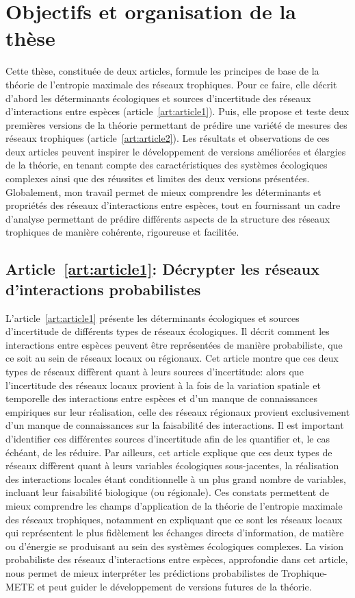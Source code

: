 \section{Objectifs et organisation de la thèse} 

Cette thèse, constituée de deux articles, formule les principes de base de la
théorie de l'entropie maximale des réseaux trophiques. Pour ce faire, elle
décrit d'abord les déterminants écologiques et sources d'incertitude des réseaux
d'interactions entre espèces (article~\ref{art:article1}). Puis, elle propose et
teste deux premières versions de la théorie permettant de prédire une variété de
mesures des réseaux trophiques (article~\ref{art:article2}). Les résultats et
observations de ces deux articles peuvent inspirer le développement de versions
améliorées et élargies de la théorie, en tenant compte des caractéristiques des
systèmes écologiques complexes ainsi que des réussites et limites des deux
versions présentées. Globalement, mon travail permet de mieux comprendre les
déterminants et propriétés des réseaux d'interactions entre espèces, tout en
fournissant un cadre d'analyse permettant de prédire différents aspects de la
structure des réseaux trophiques de manière cohérente, rigoureuse et facilitée.

\subsection{Article~\ref{art:article1}: Décrypter les réseaux d'interactions probabilistes} 

L'article~\ref{art:article1} présente les déterminants écologiques et sources
d'incertitude de différents types de réseaux écologiques. Il décrit comment les
interactions entre espèces peuvent être représentées de manière probabiliste,
que ce soit au sein de réseaux locaux ou régionaux. Cet article montre que ces
deux types de réseaux diffèrent quant à leurs sources d'incertitude: alors que
l'incertitude des réseaux locaux provient à la fois de la variation spatiale et
temporelle des interactions entre espèces et d'un manque de connaissances
empiriques sur leur réalisation, celle des réseaux régionaux provient
exclusivement d'un manque de connaissances sur la faisabilité des interactions.
Il est important d'identifier ces différentes sources d'incertitude afin de les
quantifier et, le cas échéant, de les réduire. Par ailleurs, cet article
explique que ces deux types de réseaux diffèrent quant à leurs variables
écologiques sous-jacentes, la réalisation des interactions locales étant
conditionnelle à un plus grand nombre de variables, incluant leur faisabilité
biologique (ou régionale). Ces constats permettent de mieux comprendre les
champs d'application de la théorie de l'entropie maximale des réseaux
trophiques, notamment en expliquant que ce sont les réseaux locaux qui
représentent le plus fidèlement les échanges directs d'information, de matière
ou d'énergie se produisant au sein des systèmes écologiques complexes. La vision
probabiliste des réseaux d'interactions entre espèces, approfondie dans cet
article, nous permet de mieux interpréter les prédictions probabilistes de
Trophique-METE et peut guider le développement de versions futures de la
théorie.

